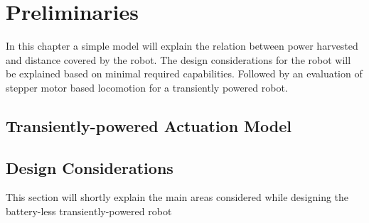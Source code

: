 \chapter{Preliminaries}

In this chapter a simple model will explain the relation between power harvested and distance covered by the robot.
The design considerations for the robot will be explained based on minimal required capabilities. 
Followed by an evaluation of stepper motor based locomotion for a transiently powered robot.

\section{Transiently-powered Actuation Model}
\label{sec:transient_model}













\section{Design Considerations}
\label{sec:design_considerations}

This section will shortly explain the main areas considered while designing the battery-less transiently-powered robot


